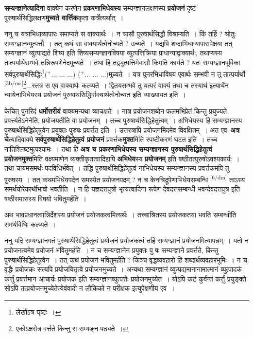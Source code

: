 \documentclass[article,12pt,a4paper]{memoir}
\newcommand{\add}[1]{($^{+}$#1)}
\begin{document}
	  \pstart \textbf{सम्यग्ज्ञानेत्यादिना} वाक्येन करणेन \textbf{प्रकरणाभिधेयस्य} सम्यग्ज्ञानलक्षणस्य \textbf{प्रयोजनं} दृष्टं पुरुषार्थसिद्धिलक्षण\textbf{मुच्यते वार्त्तिक}कृता कर्त्रेत्यर्थात् ।
	\pend
      

	  \pstart ननु च यत्राभिधाव्यापारः समाप्यते स वाक्यार्थः । न चासौ पुरुषार्थसिद्धौ विश्राम्यति । किं तर्हि ? श्रोतुः सम्यग्ज्ञानव्युत्पत्तौ । तत् कथं सा वाक्यार्थत्वेनोच्यते ? उच्यते । यद्यपि शब्दाभिधाव्यापारापेक्षया तत् सम्यग्ज्ञानं व्युत्पाद्यते शिष्य इति शिष्यसम्यग्ज्ञानविषया व्युत्पत्तिक्रिया प्राधान्याद्वाक्यार्थः, तथाप्यस्य तात्पर्यार्थसम्भवे तन्निरूपणेनेदमुच्यते । तथा हि तद्व्युत्पत्तिमेवासौ किमति कार्यते ? यतः सम्यग्ज्ञानपूर्विका सर्वपुरुषार्थसिद्धिः\footnote{लेखोऽत्र घृष्टः ।}\add{... ... ...} \add{... ... ...}मुच्यते । यत्र पुनरभिधाविषय एवार्थः सम्भवी न तु तात्पर्यार्थो \leavevmode\textsuperscript{\rmlatinfont\tiny [3b/ms]}\footnote{एकोऽक्षरोत्र वर्त्तते किन्तु स सम्यङ्न पठ्यते ।}...स्तत्र स एव वाक्यार्थः कल्प्यते । द्वितयसम्भवे तु यत्परं वाक्यं तथा च तस्यार्थ इत्यार्थेन न्यायेनाभिधेयस्य प्रयोजनं पुरुषाथसिद्धिर्वाक्यार्थत्वेनोच्यत इति व्याख्यायत इति ।
	\pend
      

	  \pstart केचित् पुनरिदं \textbf{धर्मोत्तरीयं} वाक्यमन्यथा व्याचक्षते । नात्र प्रयोजनशब्देन फलमभिप्रेतं किन्तु प्रयुज्यते प्रवर्त्त्यतेऽनेनेति, प्रयोजयतीति वा प्रयोजनम् । तच्च पुरुषार्थसिद्धिहेतुत्वम् । अभिधेयस्य हि सम्यग्ज्ञानस्य पुरुषार्थसिद्धिहेतुत्वेन प्रयुक्तः पुरुषः प्रवर्त्तत इति । उत्तरत्रापि प्रयोजनमिदमेव विवक्षितम् । अत एव--\textbf{अत्र चे}त्यादिवाक्ये \textbf{सर्वपुरुषार्थसिद्धिहेतुत्वं प्रयोजनं} प्रवर्त्तक\textbf{मुक्त}मिति स्पष्टीकरणं घटत इति । तच्च नातिश्लिष्टमुत्पश्यामः । तथा हि \textbf{अत्र च प्रकरणाभिधेयस्य सम्यग्ज्ञानस्य पुरुषार्थसिद्धिहेतुत्वं प्रयोजनमुक्त}मिति वक्ष्यमाणेन व्यक्तीकृतत्वादिहापि \textbf{अभिधेय}स्य \textbf{प्रयोजनम्} इति षष्ठीतत्पुरुषोऽवश्यकार्यः । तथा चायमसमर्थः पदविधिर्भवेत् । तद्धि पुरुषार्थसिद्धिहेतुत्वं नाभिधेयस्य सम्यग्ज्ञानस्य प्रवर्त्तकमपि तु पुरुषस्य । तत् कथमभिधेयपदेन समस्येत प्रयोजनपदम् ? न च केनचिद्रूपेणाभिधेयसम्बन्धि  \leavevmode\textsuperscript{\rmlatinfont\tiny [6/dm]} त्वऽस्य समर्थयोरेकार्थीभावो भवतीति । न हि यज्ञदत्तपुत्रो भृत्यत्वादिना रूपेण देवदत्तसम्बन्धी भवन्देवदत्तपुत्र इति षष्ठीसमासस्य विषयो भवितुमर्हति ।
	\pend
      

	  \pstart अथ भावप्रधानत्वान्निर्देशस्य प्रयोजनं प्रयोजकत्वमित्यर्थः । तच्चाश्रितस्य प्रयोजकतया भवति सम्बन्धीति समर्थविधिः कल्प्यते ।
	\pend
      

	  \pstart ननु यदि सम्यग्ज्ञानगतं पुरुषार्थसिद्धिहेतुत्वं प्रयोजनं प्रयोजकत्वं तर्हि सम्यग्ज्ञानं प्रयोजनमित्यापन्नम् । यतो न प्रयोजनत्वमेव प्रयोजनं भवितुमर्हति । न च सम्यग्ज्ञानेन प्रयुक्तः पु षः सम्यग्ज्ञाने प्रवर्त्तते, किन्तु पुरुषार्थसिद्धिहेतुत्वेन । तत् कथं प्रयोजनं भवितुमर्हति ? किञ्च वृद्धव्यवहारो हि शब्दार्थव्यवहारभूमिः । न च वृद्धैः प्रयोजकः सत्यपि प्रयोजयितृत्वे प्रयोजनमुच्यते । अन्यथा सम्यग्ज्ञानं व्युत्पद्यमानानामात्मानं व्युत्पादकं कर्त्तुं प्रवर्त्तमान आचार्यः प्रयोजक इति सम्यग्ज्ञानव्युत्पत्तेः प्रयोजनमुच्येत । योऽपि कटं कुर्वन्तं कर्त्तुं प्रयुङ्क्ते सोऽपि तत्प्रयोजनमुच्येतेत्येवंवादी न लौकिको न परीक्षक इत्युपेक्षणीय एव ।
	\pend
      
\end{document}
